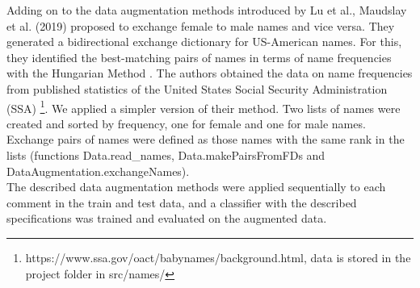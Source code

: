 \documentclass[11pt,a4paper]{article}
\begin{document}
Adding on to the data augmentation methods introduced by Lu et al., Maudslay et al. (2019) proposed to exchange female to male names and vice versa. They generated a bidirectional exchange dictionary for US-American names. For this, they identified the best-matching pairs of names in terms of name frequencies with the Hungarian Method \cite{hungarianmethod}. The authors obtained the data on name frequencies from published statistics of the United States Social Security Administration (SSA) \footnote{https://www.ssa.gov/oact/babynames/background.html, data is stored in the project folder in src/names/}. We applied a simpler version of their method. Two lists of names were created and sorted by frequency, one for female and one for male names. Exchange pairs of names were defined as those names with the same rank in the lists (functions Data.read\_names, Data.makePairsFromFDs and DataAugmentation.exchangeNames). \\
The described data augmentation methods were applied sequentially to each comment in the train and test data, and a classifier with the described specifications was trained and evaluated on the augmented data. \\
\end{document}

